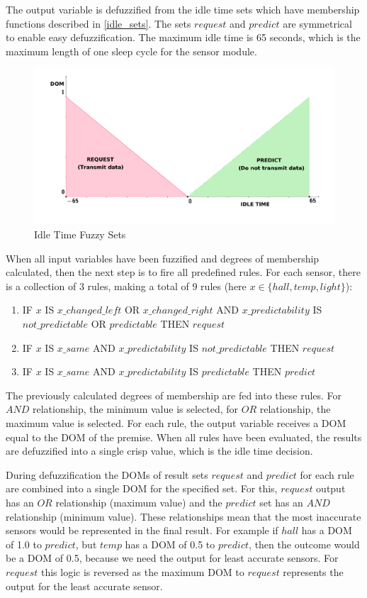 The output variable is defuzzified from the idle time sets which have membership functions described in \autoref{idle_sets}. The sets $request$ and $predict$ are symmetrical to enable easy defuzzification. The maximum idle time is 65 seconds, which is the maximum length of one sleep cycle for the sensor module. 

\begin{figure}[h!]
\centering
\includegraphics[scale=0.58]{4/figures/result_sets.pdf}
\caption{Idle Time Fuzzy Sets}
\label{idle_sets}
\end{figure}

When all input variables have been fuzzified and degrees of membership calculated, then the next step is to fire all predefined rules. For each sensor, there is a collection of 3 rules, making a total of 9 rules (here $x \in \{hall, temp, light\}$):

\begin{enumerate}
\item IF $x$ IS $x\_changed\_left$ OR $x\_changed\_right$ AND $x\_predictability$ IS $not\_predictable$ OR $predictable$ THEN $request$
\item IF $x$ IS $x\_same$ AND $x\_predictability$ IS $not\_predictable$ THEN $request$
\item IF $x$ IS $x\_same$ AND $x\_predictability$ IS $predictable$ THEN $predict$
\end{enumerate}

The previously calculated degrees of membership are fed into these rules. For $AND$ relationship, the minimum value is selected, for $OR$ relationship, the maximum value is selected. For each rule, the output variable receives a DOM equal to the DOM of the premise. When all rules have been evaluated, the results are defuzzified into a single crisp value, which is the idle time decision. 

During defuzzification the DOMs of result sets $request$ and $predict$ for each rule are combined into a single DOM for the specified set. For this, $request$ output has an $OR$ relationship (maximum value) and the $predict$ set has an $AND$ relationship (minimum value). These relationships mean that the most inaccurate sensors would be represented in the final result. For example if $hall$ has a DOM of 1.0 to $predict$, but $temp$ has a DOM of 0.5 to $predict$, then the outcome would be a DOM of 0.5, because we need the output for least accurate sensors. For $request$ this logic is reversed as the maximum DOM to $request$ represents the output for the least accurate sensor. 

